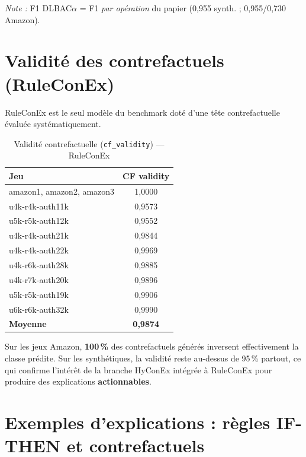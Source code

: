 \documentclass[11pt,a4paper]{article}
\begin{document}
\noindent
\textit{Note :} F1 DLBAC$\alpha$ = F1 \emph{par opération} du papier (0,955 synth. ; 0,955/0,730 Amazon).

\section{Validité des contrefactuels (RuleConEx)}

RuleConEx est le seul modèle du benchmark doté d'une tête contrefactuelle évaluée systématiquement.

\begin{table}[h]
\centering
\caption{Validité contrefactuelle (\texttt{cf\_validity}) — RuleConEx}
\label{tab:cf}
\small
\begin{tabular}{@{}lc@{}}
\toprule
\textbf{Jeu} & \textbf{CF validity} \\
\midrule
amazon1, amazon2, amazon3 & 1,0000 \\
u4k-r4k-auth11k & 0,9573 \\
u5k-r5k-auth12k & 0,9552 \\
u4k-r4k-auth21k & 0,9844 \\
u4k-r4k-auth22k & 0,9969 \\
u4k-r6k-auth28k & 0,9885 \\
u4k-r7k-auth20k & 0,9896 \\
u5k-r5k-auth19k & 0,9906 \\
u6k-r6k-auth32k & 0,9990 \\
\midrule
\textbf{Moyenne} & \textbf{0,9874} \\
\bottomrule
\end{tabular}
\end{table}

Sur les jeux Amazon, \textbf{100\,\%} des contrefactuels générés inversent effectivement la classe prédite. Sur les synthétiques, la validité reste au-dessus de 95\,\% partout, ce qui confirme l'intérêt de la branche HyConEx intégrée à RuleConEx pour produire des explications \textbf{actionnables}.

\section{Exemples d'explications : règles IF-THEN et contrefactuels}
\end{document}
